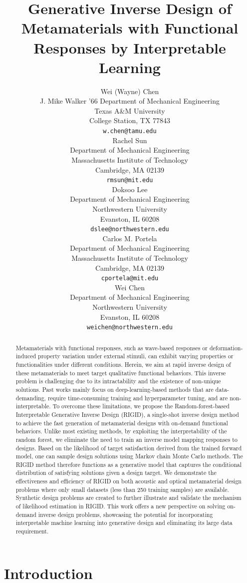 \documentclass{article}
\title{Generative Inverse Design of Metamaterials with Functional Responses by Interpretable Learning}
\author{
 Wei (Wayne) Chen \\
  J. Mike Walker ’66 Department of Mechanical Engineering\\
  Texas A\&M University\\
  College Station, TX 77843 \\
  \texttt{w.chen@tamu.edu} \\
   \And
 Rachel Sun \\
  Department of Mechanical Engineering\\
  Massachusetts Institute of Technology\\
  Cambridge, MA 02139 \\
  \texttt{rmsun@mit.edu} \\
  \And
 Doksoo Lee \\
  Department of Mechanical Engineering\\
  Northwestern University\\
  Evanston, IL 60208 \\
  \texttt{dslee@northwestern.edu} \\
  \And
 Carlos M. Portela \\
  Department of Mechanical Engineering\\
  Massachusetts Institute of Technology\\
  Cambridge, MA 02139 \\
  \texttt{cportela@mit.edu} \\
  \And
 Wei Chen \\
  Department of Mechanical Engineering\\
  Northwestern University\\
  Evanston, IL 60208 \\
  \texttt{weichen@northwestern.edu} \\
}
\begin{document}
\maketitle
\begin{abstract}
Metamaterials with functional responses, such as wave-based responses or deformation-induced property variation under external stimuli, can exhibit varying properties or functionalities under different conditions. Herein, we aim at rapid inverse design of these metamaterials to meet target qualitative functional behaviors. This inverse problem is challenging due to its intractability and the existence of non-unique solutions. Past works mainly focus on deep-learning-based methods that are data-demanding, require time-consuming training and hyperparameter tuning, and are non-interpretable. To overcome these limitations, we propose the Random-forest-based Interpretable Generative Inverse Design (RIGID), a single-shot inverse design method to achieve the fast generation of metamaterial designs with on-demand functional behaviors. Unlike most existing methods, by exploiting the interpretability of the random forest, we eliminate the need to train an inverse model mapping responses to designs. Based on the likelihood of target satisfaction derived from the trained forward model, one can sample design solutions using Markov chain Monte Carlo methods. The RIGID method therefore functions as a generative model that captures the conditional distribution of satisfying solutions given a design target. We demonstrate the effectiveness and efficiency of RIGID on both acoustic and optical metamaterial design problems where only small datasets (less than 250 training samples) are available. Synthetic design problems are created to further illustrate and validate the mechanism of likelihood estimation in RIGID. This work offers a new perspective on solving on-demand inverse design problems, showcasing the potential for incorporating interpretable machine learning into generative design and eliminating its large data requirement.
\end{abstract}



\section{Introduction}
\label{sec:introduction}
\end{document}
